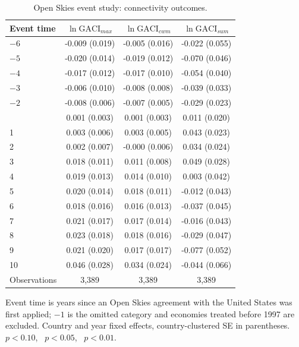 \begin{table}[H]\centering\caption{Open Skies event study: connectivity outcomes.}\label{tab:a_es_conn}
\begin{threeparttable}\small\begin{tabular}{lccc}
\toprule
Event time & $\ln\mathrm{GACI}_{max}$ & $\ln\mathrm{GACI}_{cwm}$ & $\ln\mathrm{GACI}_{sum}$ \\
\midrule
$-6$ & -0.009 (0.019) & -0.005 (0.016) & -0.022 (0.055) \\
$-5$ & -0.020 (0.014) & -0.019 (0.012) & -0.070 (0.046) \\
$-4$ & -0.017 (0.012) & -0.017\sym{*} (0.010) & -0.054 (0.040) \\
$-3$ & -0.006 (0.010) & -0.008 (0.008) & -0.039 (0.033) \\
$-2$ & -0.008 (0.006) & -0.007 (0.005) & -0.029 (0.023) \\
\addlinespace
0 & 0.001 (0.003) & 0.001 (0.003) & 0.011 (0.020) \\
1 & 0.003 (0.006) & 0.003 (0.005) & 0.043\sym{*} (0.023) \\
2 & 0.002 (0.007) & -0.000 (0.006) & 0.034 (0.024) \\
3 & 0.018 (0.011) & 0.011 (0.008) & 0.049\sym{*} (0.028) \\
4 & 0.019 (0.013) & 0.014 (0.010) & 0.003 (0.042) \\
5 & 0.020 (0.014) & 0.018\sym{*} (0.011) & -0.012 (0.043) \\
6 & 0.018 (0.016) & 0.016 (0.013) & -0.037 (0.045) \\
7 & 0.021 (0.017) & 0.017 (0.014) & -0.016 (0.043) \\
8 & 0.023 (0.018) & 0.018 (0.016) & -0.029 (0.047) \\
9 & 0.021 (0.020) & 0.017 (0.017) & -0.077 (0.052) \\
10 & 0.046 (0.028) & 0.034 (0.024) & -0.044 (0.066) \\
\midrule
Observations & 3,389 & 3,389 & 3,389 \\
\bottomrule
\end{tabular}
\begin{tablenotes}\footnotesize\item Event time is years since an Open Skies agreement with the United States was first applied; $-1$ is the omitted category and economies treated before 1997 are excluded. Country and year fixed effects, country-clustered SE in parentheses. \sym{*}~$p<0.10$, \sym{**}~$p<0.05$, \sym{***}~$p<0.01$.\end{tablenotes}\end{threeparttable}\end{table}


